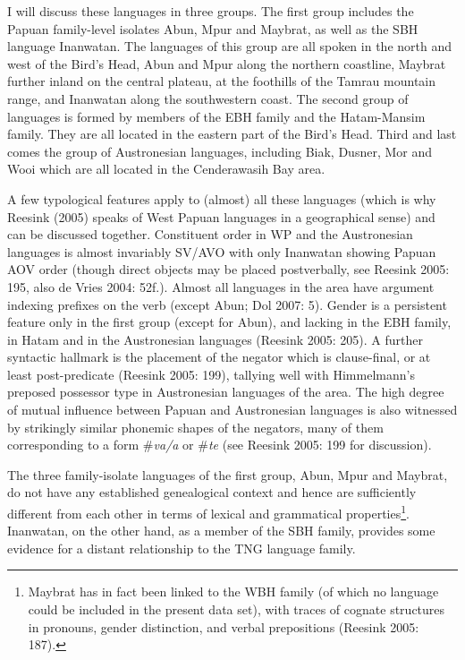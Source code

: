 I will discuss these languages in three groups. The first group includes the Papuan family-level isolates Abun, Mpur and Maybrat, as well as the \acs{SBH} language Inanwatan. The languages of this group are all spoken in the north and west of the Bird's Head, Abun and Mpur along the northern coastline, Maybrat further inland on the central plateau, at the foothills of the Tamrau mountain range, and Inanwatan along the southwestern coast. The second group of languages is formed by members of the EBH family and the Hatam-Mansim family. They are all located in the eastern part of the Bird's Head. Third and last comes the group of Austronesian languages, including Biak, Dusner, Mor and Wooi which are all located in the Cenderawasih Bay area.

A few typological features apply to (almost) all these languages (which is why Reesink (2005) speaks of West Papuan languages in a geographical sense) and can be discussed together. Constituent order in WP  and the Austronesian languages is almost invariably SV/AVO with only Inanwatan showing Papuan AOV order (though direct objects may be placed postverbally, see Reesink 2005: 195, also de Vries 2004: 52f.). Almost all languages in the area have argument indexing prefixes on the verb (except Abun; Dol 2007: 5). Gender is a persistent feature only in the first group (except for Abun), and lacking in the \acs{EBH} family, in Hatam and in the Austronesian languages (Reesink 2005: 205). A further syntactic hallmark is the placement of the negator which is clause-final, or at least post-predicate (Reesink 2005: 199), tallying well with Himmelmann's  preposed possessor type in Austronesian languages of the area. The high degree of mutual influence between Papuan and Austronesian languages is also witnessed by strikingly similar phonemic shapes of the negators, many of them corresponding to a form \#\textit{va/\textipa{\textbeta}a} or \#\textit{te} (see Reesink 2005: 199 for discussion).

The three family-isolate languages of the first group, Abun, Mpur and Maybrat, do not have any established genealogical context and hence are sufficiently different from each other in terms of lexical and grammatical properties\footnote{Maybrat has in fact been linked to the \acs{WBH} family (of which no language could be included in the present data set), with traces of cognate structures in pronouns, gender distinction, and verbal prepositions (Reesink 2005: 187).}. Inanwatan, on the other hand, as a member of the SBH family, provides some evidence for a distant relationship to the TNG language family. 

